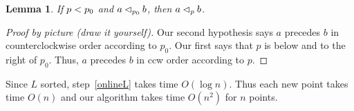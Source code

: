 \documentclass[a4paper]{article}
\newtheorem{mylemma}{\textbf{Lemma}}
\begin{document}
\begin{mylemma}
	If $p < p_0$ and $a \lhd_{p_0} b$, then $a \lhd_{p} b$.
\end{mylemma}

\begin{proof}[Proof by picture (draw it yourself)]
	Our second hypothesis says $a$ precedes $b$ in counterclockwise order according to $p_0$.
	Our first says that $p$ is below and to the right of $p_0$.
	Thus, $a$ precedes $b$ in ccw order according to $p$.
\end{proof}

Since $L$ sorted, step~\ref{onlineL} takes time $O(\log n)$.
Thus each new point takes time $O(n)$ and our algorithm takes time $O(n^2)$ for $n$ points.
\end{document}
